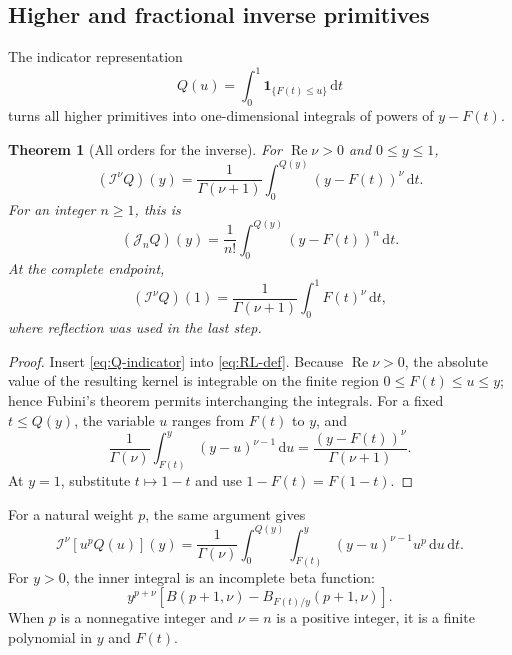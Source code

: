 \documentclass[11pt,oneside]{article}
\newtheorem{theorem}{Theorem}[section]
\theoremstyle{definition}
\theoremstyle{remark}
\newcommand{\dd}{\,\mathrm d}
\newcommand{\Jn}{\mathcal J}
\newcommand{\RL}{\mathcal I}
\newcommand{\1}{\mathbf 1}
\DeclareMathOperator{\Rea}{Re}
\begin{document}
\subsection{Higher and fractional inverse primitives}
The indicator representation
\begin{equation}
 Q(u)=\int_0^1\1_{\{F(t)\leq u\}}\dd t                         \label{eq:Q-indicator}
\end{equation}
turns all higher primitives into one-dimensional integrals of powers of
\(y-F(t)\).

\begin{theorem}[All orders for the inverse]\label{thm:inverse-all-orders}
For \(\Rea\nu>0\) and \(0\leq y\leq1\),
\begin{equation}
 \boxed{\quad
 (\RL^\nu Q)(y)
 =\frac1{\Gamma(\nu+1)}
 \int_0^{Q(y)}(y-F(t))^\nu\dd t.
 \quad}                                                        \label{eq:inverse-fractional}
\end{equation}
For an integer \(n\geq1\), this is
\begin{equation}
 (\Jn_nQ)(y)=\frac1{n!}\int_0^{Q(y)}(y-F(t))^n\dd t.           \label{eq:inverse-integer-n}
\end{equation}
At the complete endpoint,
\begin{equation}
 (\RL^\nu Q)(1)
 =\frac1{\Gamma(\nu+1)}\int_0^1F(t)^\nu\dd t,                 \label{eq:inverse-fractional-one}
\end{equation}
where reflection was used in the last step.
\end{theorem}

\begin{proof}
Insert \eqref{eq:Q-indicator} into \eqref{eq:RL-def}.  Because
\(\Rea\nu>0\), the absolute value of the resulting kernel is integrable on
the finite region \(0\leq F(t)\leq u\leq y\); hence Fubini's theorem permits
interchanging the integrals.  For a fixed \(t\leq Q(y)\), the variable \(u\)
ranges from \(F(t)\) to \(y\), and
\[
 \frac1{\Gamma(\nu)}\int_{F(t)}^y(y-u)^{\nu-1}\dd u
 =\frac{(y-F(t))^\nu}{\Gamma(\nu+1)}.
\]
At \(y=1\), substitute \(t\mapsto1-t\) and use
\(1-F(t)=F(1-t)\).
\end{proof}

For a natural weight \(p\), the same argument gives
\begin{equation}
 \boxed{\quad
 \RL^\nu[u^pQ(u)](y)
 =\frac1{\Gamma(\nu)}\int_0^{Q(y)}
 \int_{F(t)}^y(y-u)^{\nu-1}u^p\dd u\dd t.
 \quad}                                                        \label{eq:inverse-weighted-fractional}
\end{equation}
For \(y>0\), the inner integral is an incomplete beta function:
\begin{equation}
 y^{p+\nu}
 \left[B(p+1,\nu)-B_{F(t)/y}(p+1,\nu)\right].                 \label{eq:inverse-beta}
\end{equation}
When \(p\) is a nonnegative integer and \(\nu=n\) is a positive integer, it
is a finite polynomial in \(y\) and \(F(t)\).
\end{document}
